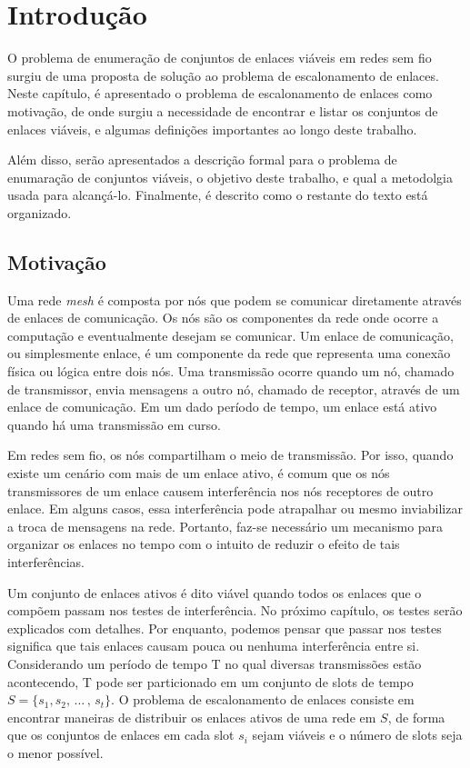 \chapter{Introdução}
\label{cap:introducao}

O problema de enumeração de conjuntos de enlaces viáveis em redes sem fio surgiu de uma proposta de solução ao problema de escalonamento de enlaces. Neste capítulo, é apresentado o problema de escalonamento de enlaces como motivação, de onde surgiu a necessidade de encontrar e listar os conjuntos de enlaces viáveis, e algumas definições importantes ao longo deste trabalho.

Além disso, serão apresentados a descrição formal para o problema de enumaração de conjuntos viáveis, o objetivo deste trabalho, e qual a metodolgia usada para alcançá-lo. Finalmente, é descrito como o restante do texto está organizado.

\section{Motivação}

Uma rede {\it mesh} é composta por nós que podem se comunicar diretamente através de enlaces de comunicação. Os nós são os componentes da rede onde ocorre a computação e eventualmente desejam se comunicar. Um enlace de comunicação, ou simplesmente enlace, é um componente da rede que representa uma conexão física ou lógica entre dois nós.  Uma transmissão ocorre quando um nó, chamado de transmissor, envia mensagens a outro nó, chamado de receptor, através de um enlace de comunicação. Em um dado período de tempo, um enlace está ativo quando há uma transmissão em curso.

Em redes sem fio, os nós compartilham o meio de transmissão. Por isso, quando existe um cenário com mais de um enlace ativo, é comum que os nós transmissores de um enlace causem interferência nos nós receptores de outro enlace. Em alguns casos, essa interferência pode atrapalhar ou mesmo inviabilizar a troca de mensagens na rede. Portanto, faz-se necessário um mecanismo para organizar os enlaces no tempo com o intuito de reduzir o efeito de tais interferências.

Um conjunto de enlaces ativos é dito viável quando todos os enlaces que o compõem passam nos testes de interferência. No próximo capítulo, os testes serão explicados com detalhes. Por enquanto, podemos pensar que passar nos testes significa que tais enlaces causam pouca ou nenhuma interferência entre si.
Considerando um período de tempo T no qual diversas transmissões estão acontecendo, T pode ser particionado em um conjunto de slots de tempo $S=\{s_1, s_2, \, \ldots \, , \, s_t\}$. O problema de escalonamento de enlaces consiste em encontrar maneiras de distribuir os enlaces ativos de uma rede em $S$, de forma que os conjuntos de enlaces em cada slot $s_i$ sejam viáveis e o número de slots seja o menor possível.

